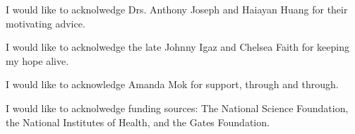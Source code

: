 \documentclass{ucbthesis}
\begin{document}
\begin{frontmatter}
\begin{acknowledgements}
I would like to acknolwedge Drs. Anthony Joseph and Haiayan Huang for
their motivating advice.  

I would like to acknolwedge the late Johnny Igaz and Chelsea Faith for
keeping my hope alive.

I would like to acknowledge Amanda Mok for support, through and
through.

I would like to acknolwedge funding sources: The National Science
Foundation, the National Institutes of Health, and the Gates
Foundation. 




\end{acknowledgements}

\end{frontmatter}

\pagestyle{headings}







\sloppy
\printbibliography
\begin{appendices}
  
\end{appendices}
\end{document}
